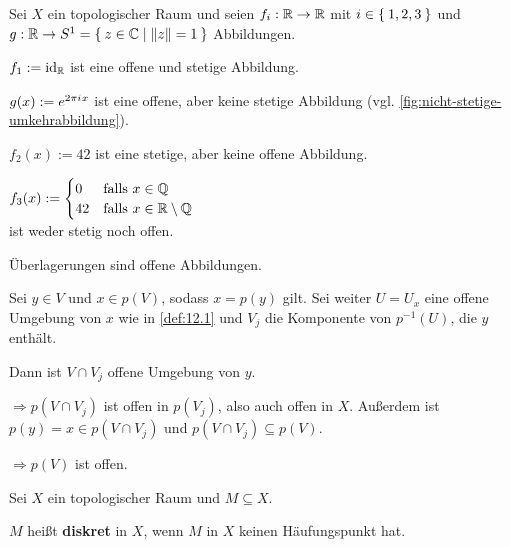 \begin{beispiel}
    Sei $X$ ein topologischer Raum und seien
    $f_i: \mathbb{R} \rightarrow \mathbb{R}$ mit $i \in \Set{1,2,3}$ und
    $g: \mathbb{R} \rightarrow S^1 = \Set{z \in \ensuremath{\mathbb{C}}| \|z\| = 1}$ Abbildungen.
    \begin{bspenum}
        \item $f_1 := \textnormal{id}_{\mathbb{R}}$ ist eine offene und stetige Abbildung.
        \item $g(x) := e^{2 \pi {i\mkern1mu} x}$ ist eine offene, aber keine stetige Abbildung (vgl. \cref{fig:nicht-stetige-umkehrabbildung}).
        \item $f_2(x) := 42$ ist eine stetige, aber keine offene Abbildung.
        \item $f_3(x) := \begin{cases}
                0  &\text{falls } x \in \mathbb{Q}\\
                42 &\text{falls } x \in \mathbb{R} \setminus \mathbb{Q}
        \end{cases}$\\
        ist weder stetig noch offen.
    \end{bspenum}
\end{beispiel}

\begin{bemerkung}\label{bem:12.2} %
    Überlagerungen sind offene Abbildungen.
\end{bemerkung}

\begin{beweis}
    Sei $y \in V$ und $x \in p(V)$, sodass $x=p(y)$ gilt.
    Sei weiter $U = U_x$ eine offene Umgebung von $x$ wie in \cref{def:12.1}
    und $V_j$ die Komponente von $p^{-1}(U)$, die $y$ enthält.

    Dann ist $V \cap V_j$ offene Umgebung von $y$.

    $\Rightarrow p(V \cap V_j)$ ist offen in $p(V_j)$, also auch offen
    in $X$. Außerdem ist $p(y) = x \in p(V \cap V_j)$ und
    $p(V \cap V_j) \subseteq p(V)$.

    $\Rightarrow p(V)$ ist offen.
\end{beweis}

\begin{definition}%
    Sei $X$ ein topologischer Raum und $M \subseteq X$.

    $M$ heißt \textbf{diskret} in $X$, wenn $M$ in $X$ keinen 
    Häufungspunkt hat.
\end{definition}

